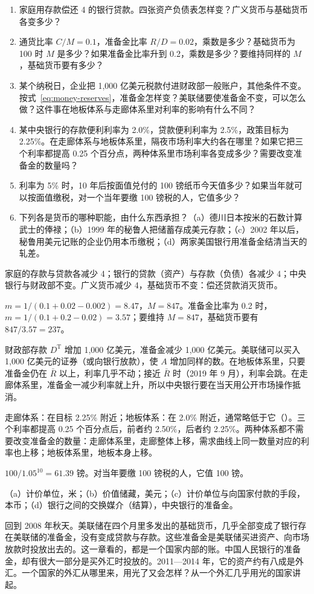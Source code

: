 \begin{selfcheck}
\begin{enumerate}
\item 家庭用存款偿还 4 的银行贷款。四张资产负债表怎样变？广义货币与基础货币各变多少？
\item 通货比率 $C/M=0.1$，准备金比率 $R/D=0.02$，乘数是多少？基础货币为 100 时 $M$ 是多少？如果准备金比率升到 0.2，乘数是多少？要维持同样的 $M$，基础货币要有多少？
\item 某个纳税日，企业把 1,000 亿美元税款付进财政部一般账户，其他条件不变。按式~\eqref{eq:money-reserves}，准备金怎样变？美联储要使准备金不变，可以怎么做？这件事在地板体系与走廊体系里对利率的影响有什么不同？
\item 某中央银行的存款便利利率为 2.0\%，贷款便利利率为 2.5\%，政策目标为 2.25\%。在走廊体系与地板体系里，隔夜市场利率大约各在哪里？如果它把三个利率都提高 0.25 个百分点，两种体系里市场利率各变成多少？需要改变准备金的数量吗？
\item 利率为 5\% 时，10 年后按面值兑付的 100 镑纸币今天值多少？如果当年就可以按面值缴税，对一个当年要缴 100 镑税的人，它值多少？
\item 下列各是货币的哪种职能，由什么东西承担？（a）德川日本按米的石数计算武士的俸禄；（b）1999 年的秘鲁人把储蓄存成美元存款；（c）2002 年以后，秘鲁用美元记账的企业仍用本币缴税；（d）两家美国银行用准备金结清当天的轧差。
\end{enumerate}
\end{selfcheck}

\begin{answers}
\item 家庭的存款与贷款各减少 4；银行的贷款（资产）与存款（负债）各减少 4；中央银行与财政部不变。广义货币减少 4，基础货币不变：偿还贷款消灭货币。
\item $m=1/(0.1+0.02-0.002)=8.47$，$M=847$。准备金比率为 0.2 时，$m=1/(0.1+0.2-0.02)=3.57$；要维持 $M=847$，基础货币要有 $847/3.57=237$。
\item 财政部存款 $D^{\mathrm T}$ 增加 1,000 亿美元，准备金减少 1,000 亿美元。美联储可以买入 1,000 亿美元的证券（或向银行放款），使 $A$ 增加同样的数。在地板体系里，只要准备金仍在 $\bar R$ 以上，利率几乎不动；接近 $\bar R$ 时（2019 年 9 月），利率会跳。在走廊体系里，准备金一减少利率就上升，所以中央银行要在当天用公开市场操作抵消。
\item 走廊体系：在目标 2.25\% 附近；地板体系：在 2.0\% 附近，通常略低于它（）。三个利率都提高 0.25 个百分点后，前者约 2.50\%，后者约 2.25\%。两种体系都不需要改变准备金的数量：走廊体系里，走廊整体上移，需求曲线上同一数量对应的利率也上移；地板体系里，地板本身上移。
\item $100/1.05^{10}=61.39$ 镑。对当年要缴 100 镑税的人，它值 100 镑。
\item （a）计价单位，米；（b）价值储藏，美元；（c）计价单位与向国家付款的手段，本币；（d）银行之间的交换媒介（结算），中央银行的准备金。
\end{answers}

回到 2008 年秋天。美联储在四个月里多发出的基础货币，几乎全部变成了银行存在美联储的准备金，没有变成贷款与存款。这些准备金是美联储买进资产、向市场放款时投放出去的。这一章看的，都是一个国家内部的账。中国人民银行的准备金，却有很大一部分是买外汇时投放的。2011—2014 年，它的资产约有八成是外汇。一个国家的外汇从哪里来，用光了又会怎样？从一个外汇几乎用光的国家讲起。
